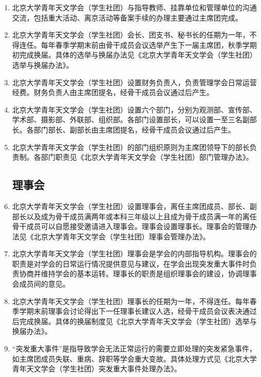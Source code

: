 \begin{enumerate}[resume]
    \item 北京大学青年天文学会（学生社团）与指导教师、挂靠单位和管理单位的沟通交流，包括重大活动、离京活动等备案手续的办理主要通过主席团完成。
    
    \item 北京大学青年天文学会（学生社团）会长、团支书、秘书长的任期为一年，不得连任。每年春季学期末前由骨干成员会议选举产生下一届主席团，秋季学期初完成换届。具体的选举与换届办法见《北京大学青年天文学会（学生社团）选举与换届办法》。
    
    \item 北京大学青年天文学会（学生社团）设置财务负责人，负责管理学会日常运营经费。财务负责人由主席团提名，经骨干成员会议通过后产生。
    
    \item 北京大学青年天文学会（学生社团）设置六个部门，分别为观测部、宣传部、学术部、摄影部、外联部、组织部。各部门设置部长，可以设置一至三名副部长。各部门部长、副部长由主席团提名，经骨干成员会议通过后产生。
    
    \item 北京大学青年天文学会（学生社团）的部门组织原则为主席团领导下的部长负责制。各部门职责见《北京大学青年天文学会（学生社团）部门管理办法》。
    
    \subsection{理事会}
    
    \item 北京大学青年天文学会（学生社团）设置理事会，离任主席团成员、部长、副部长以及成为骨干成员满两年或本科三年级以上且成为骨干成员满一年的离任骨干成员可以自愿接受邀请进入理事会。理事会设置理事长。理事会的管理办法见《北京大学青年天文学会（学生社团）理事会管理办法》。
    
    \item 北京大学青年天文学会（学生社团）理事会是学会的内部指导机构。理事会的职责是对学会的日常运行情况提供意见与建议，在学会出现突发重大事件时负责协商并维持学会的基本运转。理事长的职责是组织理事会的建设，协调理事会成员间的意见。
    
    \item 北京大学青年天文学会（学生社团）理事长的任期为一年，不得连任。每年春季学期末前理事会讨论得出下一任理事长建议人选，经骨干成员会议表决通过后完成换届。具体的换届制度见《北京大学青年天文学会（学生社团）选举与换届办法》。
    
    \item “突发重大事件”是指导致学会无法正常运行的需要立即处理的突发紧急事件，如主席团成员失联、重病、辞职等学会重大变故。具体处理方式见《北京大学青年天文学会（学生社团）突发重大事件处理办法》。
    
\end{enumerate}

